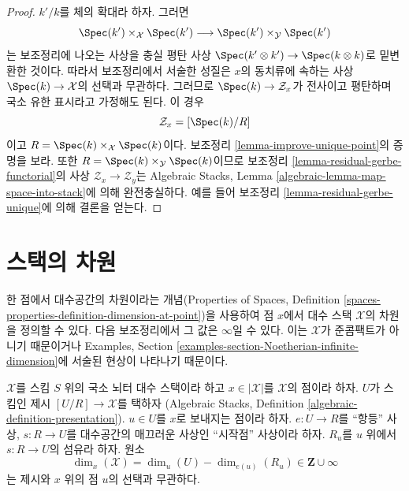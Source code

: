 \begin{proof}
$k'/k$를 체의 확대라 하자. 그러면
$$
\Spec(k') \times_\mathcal{X} \Spec(k')
\longrightarrow
\Spec(k') \times_\mathcal{Y} \Spec(k')
$$
는 보조정리에 나오는 사상을 충실 평탄 사상
$\Spec(k' \otimes k') \to \Spec(k \otimes k)$로 밑변환한 것이다.
따라서 보조정리에서 서술한 성질은 $x$의 동치류에 속하는 사상
$\Spec(k) \to \mathcal{X}$의 선택과 무관하다. 그러므로
$\Spec(k) \to \mathcal{Z}_x$가 전사이고 평탄하며 국소 유한 표시라고
가정해도 된다. 이 경우
$$
\mathcal{Z}_x = [\Spec(k)/R]
$$
이고 $R = \Spec(k) \times_\mathcal{X} \Spec(k)$이다.
보조정리 \ref{lemma-improve-unique-point}의 증명을 보라.
또한 $R = \Spec(k) \times_\mathcal{Y} \Spec(k)$이므로
보조정리 \ref{lemma-residual-gerbe-functorial}의 사상
$\mathcal{Z}_x \to \mathcal{Z}_y$는 Algebraic Stacks, Lemma
\ref{algebraic-lemma-map-space-into-stack}에 의해 완전충실하다.
예를 들어 보조정리 \ref{lemma-residual-gerbe-unique}에 의해 결론을 얻는다.
\end{proof}








\section{스택의 차원}
\label{section-dimension}

\noindent
한 점에서 대수공간의 차원이라는 개념(Properties of Spaces,
Definition \ref{spaces-properties-definition-dimension-at-point})을 사용하여
점 $x$에서 대수 스택 $\mathcal{X}$의 차원을 정의할 수 있다.
다음 보조정리에서 그 값은 $\infty$일 수 있다. 이는 $\mathcal{X}$가
준콤팩트가 아니기 때문이거나 Examples, Section
\ref{examples-section-Noetherian-infinite-dimension}에 서술된 현상이
나타나기 때문이다.

\begin{lemma}
\label{lemma-dimension-at-point-well-defined}
$\mathcal{X}$를 스킴 $S$ 위의 국소 뇌터 대수 스택이라 하고
$x \in |\mathcal{X}|$를 $\mathcal{X}$의 점이라 하자.
$U$가 스킴인 제시 $[U/R] \to \mathcal{X}$를 택하자
(Algebraic Stacks, Definition \ref{algebraic-definition-presentation}).
$u \in U$를 $x$로 보내지는 점이라 하자. $e : U \to R$를 ``항등'' 사상,
$s : R \to U$를 대수공간의 매끄러운 사상인 ``시작점'' 사상이라 하자.
$R_u$를 $u$ 위에서 $s : R \to U$의 섬유라 하자. 원소
$$
\dim_x(\mathcal{X}) = \dim_u(U) - \dim_{e(u)}(R_u) \in \mathbf{Z} \cup \infty
$$
는 제시와 $x$ 위의 점 $u$의 선택과 무관하다.
\end{lemma}

